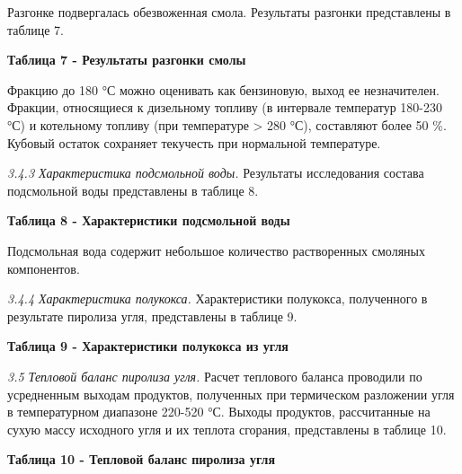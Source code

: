 Разгонке подвергалась обезвоженная смола. Результаты разгонки
представлены в таблице 7.

{\bfseries Таблица 7 - Результаты разгонки смолы}


Фракцию до 180 °С можно оценивать как бензиновую, выход ее незначителен.
Фракции, относящиеся к дизельному топливу (в интервале температур
180-230 °С) и котельному топливу (при температуре \textgreater{} 280
°С), составляют более 50 \%. Кубовый остаток сохраняет текучесть при
нормальной температуре.

\emph{3.4.3 Характеристика подсмольной воды.} Результаты исследования
состава подсмольной воды представлены в таблице 8.

{\bfseries Таблица 8 - Характеристики подсмольной воды}


Подсмольная вода содержит небольшое количество растворенных смоляных
компонентов.

\emph{3.4.4 Характеристика полукокса.} Характеристики полукокса,
полученного в результате пиролиза угля, представлены в таблице 9.

{\bfseries Таблица 9 - Характеристики полукокса из угля}


\emph{3.5 Тепловой баланс пиролиза угля.} Расчет теплового баланса
проводили по усредненным выходам продуктов, полученных при термическом
разложении угля в температурном диапазоне 220-520 °С. Выходы продуктов,
рассчитанные на сухую массу исходного угля и их теплота сгорания,
представлены в таблице 10.

{\bfseries Таблица 10 - Тепловой баланс пиролиза угля}

